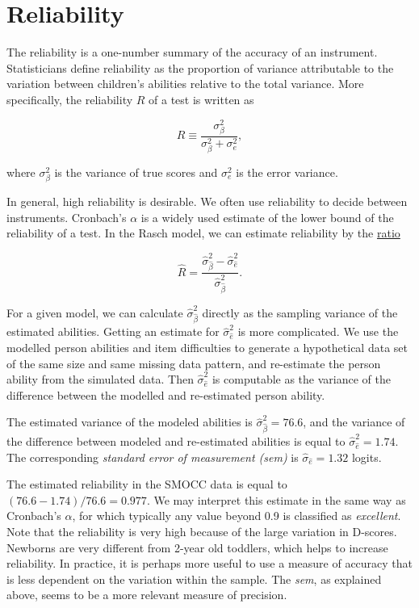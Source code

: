 \documentclass[
]{book}
\begin{document}
\hypertarget{sec:reliability}{%
\section{Reliability}\label{sec:reliability}}

The reliability is a one-number summary of the accuracy of an instrument. Statisticians define reliability as the proportion of variance attributable to the variation between children's abilities relative to the total variance. More specifically, the reliability \(R\) of a test is written as

\[R \equiv \frac{\sigma_{\beta}^2}{\sigma_{\beta}^2 + \sigma_{e}^2},\]

where \(\sigma_{\beta}^2\) is the variance of true scores and \(\sigma_{e}^2\) is the error variance.

In general, high reliability is desirable. We often use reliability to decide between instruments. Cronbach's \(\alpha\) is a widely used estimate of the lower bound of the reliability of a test. In the Rasch model, we can estimate reliability by the \href{http://www.rummlab.com.au/rmrelidx2030}{ratio}

\[\hat{R} = \frac{\hat\sigma_{\hat\beta}^2 - \hat\sigma_{\hat e}^2}{\hat\sigma_{\hat\beta}^2}.\]

For a given model, we can calculate \(\hat\sigma_{\hat\beta}^2\) directly as the sampling variance of the estimated abilities. Getting an estimate for \(\hat\sigma_{\hat e}^2\) is more complicated. We use the modelled person abilities and item difficulties to generate a hypothetical data set of the same size and same missing data pattern, and re-estimate the person ability from the simulated data. Then \(\hat\sigma_{\hat e}^2\) is computable as the variance of the difference between the modelled and re-estimated person ability.

The estimated variance of the modeled abilities is \(\hat\sigma_{\hat\beta}^2 = 76.6\), and the variance of the difference between modeled and re-estimated abilities is equal to \(\hat\sigma_{\hat e}^2 = 1.74\). The corresponding \emph{standard error of measurement (sem)} is \(\hat\sigma_{\hat e} = 1.32\) logits.

The estimated reliability in the SMOCC data is equal to \((76.6-1.74)/76.6 = 0.977\). We may interpret this estimate in the same way as Cronbach's \(\alpha\), for which typically any value beyond 0.9 is classified as \emph{excellent}. Note that the reliability is very high because of the large variation in D-scores. Newborns are very different from 2-year old toddlers, which helps to increase reliability. In practice, it is perhaps more useful to use a measure of accuracy that is less dependent on the variation within the sample. The \emph{sem}, as explained above, seems to be a more relevant measure of precision.
\end{document}
